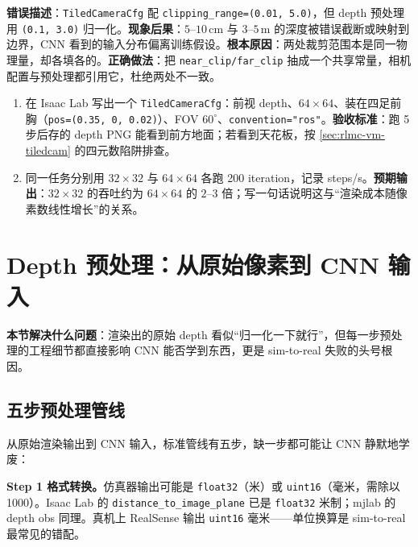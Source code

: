 \begin{pitfall}
\textbf{错误描述}：\verb|TiledCameraCfg| 配 \verb|clipping_range=(0.01, 5.0)|，但 depth 预处理用 \verb|(0.1, 3.0)| 归一化。\textbf{现象后果}：$5$--$10$\,cm 与 $3$--$5$\,m 的深度被错误截断或映射到边界，CNN 看到的输入分布偏离训练假设。\textbf{根本原因}：两处裁剪范围本是同一物理量，却各填各的。\textbf{正确做法}：把 \verb|near_clip/far_clip| 抽成一个共享常量，相机配置与预处理都引用它，杜绝两处不一致。
\end{pitfall}

\begin{practice}[配一个能看到地形的相机]
\begin{enumerate}
\item 在 Isaac Lab 写出一个 \verb|TiledCameraCfg|：前视 depth、$64\times64$、装在四足前胸（\verb|pos=(0.35, 0, 0.02)|）、FOV $60^\circ$、\verb|convention="ros"|。\textbf{验收标准}：跑 5 步后存的 depth PNG 能看到前方地面；若看到天花板，按 \cref{sec:rlmc-vm-tiledcam} 的四元数陷阱排查。
\item 同一任务分别用 $32\times32$ 与 $64\times64$ 各跑 200 iteration，记录 steps/s。\textbf{预期输出}：$32\times32$ 的吞吐约为 $64\times64$ 的 $2$--$3$ 倍；写一句话说明这与“渲染成本随像素数线性增长”的关系。
\end{enumerate}
\end{practice}

\section{Depth 预处理：从原始像素到 CNN 输入}
\label{sec:rlmc-vm-preprocess}

\textbf{本节解决什么问题}：渲染出的原始 depth 看似“归一化一下就行”，但每一步预处理的工程细节都直接影响 CNN 能否学到东西，更是 sim-to-real 失败的头号根因。

\subsection{五步预处理管线}
\label{sec:rlmc-vm-fivestep}

从原始渲染输出到 CNN 输入，标准管线有五步，缺一步都可能让 CNN 静默地学废：

\textbf{Step 1 格式转换。}仿真器输出可能是 \verb|float32|（米）或 \verb|uint16|（毫米，需除以 1000）。Isaac Lab 的 \verb|distance_to_image_plane| 已是 \verb|float32| 米制；mjlab 的 depth obs 同理。真机上 RealSense 输出 \verb|uint16| 毫米——单位换算是 sim-to-real 最常见的错配。

